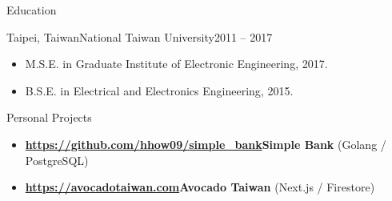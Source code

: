\documentclass[]{mcdowellcv}
\begin{document}
	\begin{cvsection}{Education}
		\begin{cvsubsection}{Taipei, Taiwan}{National Taiwan University}{2011 -- 2017}
			\begin{itemize}
				\item M.S.E. in Graduate Institute of Electronic Engineering, 2017.
				\item B.S.E. in Electrical and Electronics Engineering, 2015.
			\end{itemize}
		\end{cvsubsection}
	\end{cvsection}
	
	\begin{cvsection}{Personal Projects}
		\begin{cvsubsection}{}{}{}
			\begin{itemize}
				\item \textbf{\url{https://github.com/hhow09/simple_bank}{Simple Bank}} (Golang / PostgreSQL)
				\item \textbf{\url{https://avocadotaiwan.com}{Avocado Taiwan}} (Next.js / Firestore)
			\end{itemize}
		\end{cvsubsection}
	\end{cvsection}
	
\end{document}

